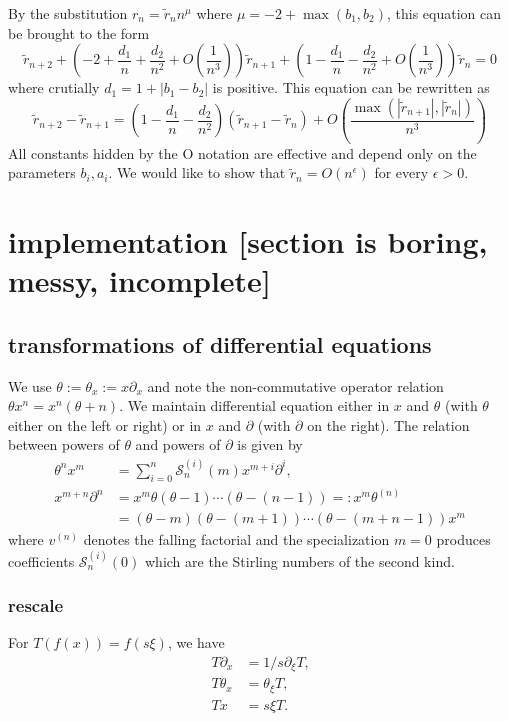\documentclass[12pt]{article}
\numberwithin{equation}{section}
\begin{document}
By the substitution $r_n = \tilde{r}_n n^\mu$ where $\mu = -2 + \operatorname{max}(b_1,b_2)$, this equation can be brought to the form
\begin{equation*}
\tilde{r}_{n+2} + \left(-2 + \frac{d_1}{n} + \frac{d_2}{n^2} + O(\frac{1}{n^3}) \right) \tilde{r}_{n+1} + \left(1 - \frac{d_1}{n} - \frac{d_2}{n^2} + O(\frac{1}{n^3}) \right) \tilde{r}_{n} = 0
\end{equation*}
where crutially $d_1 = 1 + |b_1-b_2|$ is positive. This equation can be rewritten as
\begin{equation*}
\tilde{r}_{n+2} - \tilde{r}_{n+1} = \left(1 - \frac{d_1}{n} - \frac{d_2}{n^2} \right) (\tilde{r}_{n+1} - \tilde{r}_{n}) + O(\frac{\operatorname{max}(|\tilde{r}_{n+1}|, |\tilde{r}_{n}|)}{n^3})
\end{equation*}
All constants hidden by the O notation are effective and depend only on the parameters $b_i,a_i$. We would like to show that $\tilde{r}_{n} = O(n^{\epsilon})$ for every $\epsilon > 0$.



\section{implementation [section is boring, messy, incomplete]}

\subsection{transformations of differential equations}
We use $\theta := \theta_x := x \partial_x$ and note the non-commutative operator relation $\theta x^n = x^n (\theta+n)$. We maintain differential equation either in $x$ and $\theta$ (with $\theta$ either on the left or right) or in $x$ and $\partial$ (with $\partial$ on the right). The relation between powers of $\theta$ and powers of $\partial$ is given by
\begin{align*}
\theta^n x^m &= \sum_{i=0}^{n} \mathcal{S}_{n}^{(i)}(m) x^{m+i} \partial^i\text{,}\\
x^{m+n} \partial^n &= x^m \theta (\theta-1)\cdots(\theta-(n-1)) =:x^m \theta^{(n)}\\
&= (\theta-m)(\theta-(m+1))\cdots(\theta-(m+n-1))x^m
\end{align*}
where $v^{(n)}$ denotes the falling factorial and the specialization $m=0$ produces coefficients $\mathcal{S}_{n}^{(i)}(0)$ which are the Stirling numbers of the second kind.

\subsubsection{rescale}
For $T(f(x)) = f(s \xi)$, we have
\begin{align*}
T \partial_x &= 1/s \partial_{\xi} T\text{,}\\
T \theta_x &= \theta_{\xi} T \text{,}\\
T x &= s \xi T\text{.}
\end{align*}
\end{document}
